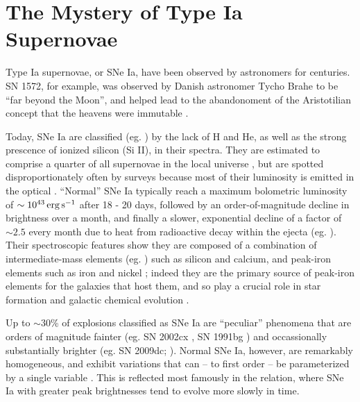 \section{The Mystery of Type Ia Supernovae}
\label{sec:c1_mysteryofsneia}


Type Ia supernovae, or SNe Ia, have been observed by astronomers for centuries.  SN 1572, for example, was observed by Danish astronomer Tycho Brahe to be ``far beyond the Moon'', and helped lead to the abandonoment of the Aristotilian concept that the heavens were immutable \citep{ruiz04, krau+08}.

Today, SNe Ia are classified (eg. \citealt{fili97, li+11}) by the lack of H and He, as well as the strong prescence of ionized silicon (Si II), in their spectra.  They are estimated to comprise a quarter of all supernovae in the local universe \citep{li+11}, but are spotted disproportionately often by surveys because most of their luminosity is emitted in the optical \citep{howe11}.  ``Normal'' SNe Ia \citep{bran98, bran+06} typically reach a maximum bolometric luminosity of $\sim10^{43}\,\ergpsec$ after 18 - 20 days, followed by an order-of-magnitude decline in brightness over a month, and finally a slower, exponential decline of a factor of $\sim2.5$ every month due to heat from radioactive decay within the ejecta (eg. \citealt{fili97, hill+13}).  Their spectroscopic features show they are composed of a combination of intermediate-mass elements (eg. \citealt{arne96}) such as silicon and calcium, and peak-iron elements such as iron and nickel \citep{fili97}; indeed they are the primary source of peak-iron elements for the galaxies that host them, and so play a crucial role in star formation and galactic chemical evolution \citep{leib00}.  

Up to $\sim30$\% \citep{li+11} of explosions classified as SNe Ia are ``peculiar'' phenomena that are orders of magnitude fainter (eg. SN 2002cx \citep{li+02, fole+13}, SN 1991bg \citep{mazz+97}) and occassionally substantially brighter (eg. SN 2009dc; \citealt{yama+09, taub+09}).  Normal SNe Ia, however, are remarkably homogeneous, and exhibit variations that can -- to first order -- be parameterized by a single variable \citep{hilln00, howe11}.  This is reflected most famously in the \cite{phil93} relation, where SNe Ia with greater peak brightnesses tend to evolve more slowly in time.  

